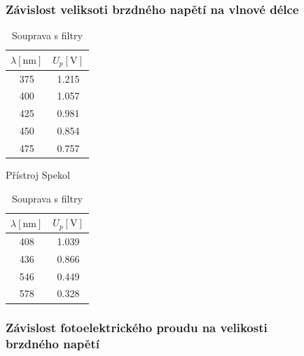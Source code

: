 \documentclass[titlepage]{article}
\begin{document}
\subsubsection{Závislost veliksoti brzdného napětí na vlnové délce}
\begin{table}[!htb]
    \begin{minipage}{.5\linewidth}
      \centering
        \begin{tabular}{c||c}
           $\lambda [\si{\nano\meter}]$ & $U_p [\si{\volt}]$\\ \hline \hline
           375 & 1.215\\ \hline
           400 & 1.057\\ \hline
           425 & 0.981\\ \hline
           450 & 0.854\\ \hline
           475 & 0.757
        \end{tabular}
        \caption{Přístroj Spekol}
    \end{minipage}%
    \begin{minipage}{.5\linewidth}
      \centering
        \begin{tabular}{c||c}
           $\lambda [\si{\nano\meter}]$ & $U_p [\si{\volt}]$\\ \hline \hline
           408 & 1.039\\ \hline
           436 & 0.866\\ \hline
           546 & 0.449\\ \hline
           578 & 0.328
        \end{tabular}
        \caption{Souprava s filtry}
    \end{minipage}
\end{table}

\subsubsection{Závislost fotoelektrického proudu na velikosti \\brzdného napětí}
\end{document}
